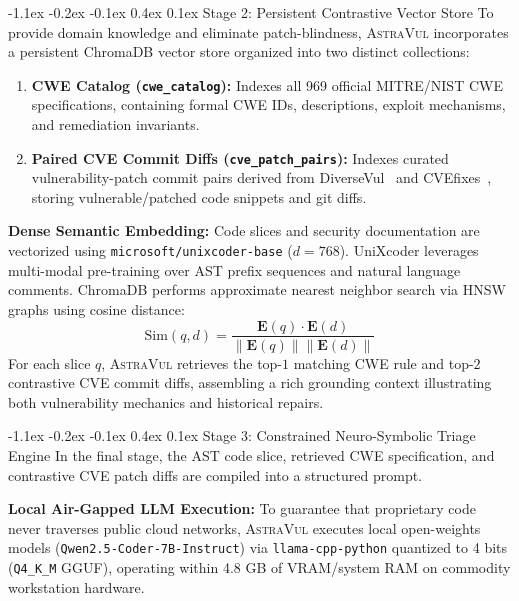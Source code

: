 \documentclass[10pt,twocolumn]{article}
\makeatletter
\renewcommand\subsection{\@startsection{subsection}{2}{\z@}%
  {-1.1ex \@plus -0.2ex \@minus -0.1ex}%
  {0.4ex \@plus 0.1ex}%
  {\normalfont\normalsize\bfseries}}
\makeatother
\begin{document}
\subsection{Stage 2: Persistent Contrastive Vector Store}
To provide domain knowledge and eliminate patch-blindness, \textsc{AstraVul} incorporates a persistent ChromaDB vector store organized into two distinct collections:
\begin{enumerate}[leftmargin=9pt,topsep=1pt,itemsep=0.5pt]
    \item \textbf{CWE Catalog (\texttt{cwe\_catalog}):} Indexes all 969 official MITRE/NIST CWE specifications, containing formal CWE IDs, descriptions, exploit mechanisms, and remediation invariants.
    \item \textbf{Paired CVE Commit Diffs (\texttt{cve\_patch\_pairs}):} Indexes curated vulnerability-patch commit pairs derived from DiverseVul~\cite{chen2023diversevul} and CVEfixes~\cite{bhandari2021cvefixes}, storing vulnerable/patched code snippets and git diffs.
\end{enumerate}

\vspace{1pt}\noindent\textbf{Dense Semantic Embedding:}
Code slices and security documentation are vectorized using \texttt{microsoft/unixcoder-base} ($d=768$). UniXcoder leverages multi-modal pre-training over AST prefix sequences and natural language comments. ChromaDB performs approximate nearest neighbor search via HNSW graphs using cosine distance:
\begin{equation}
    \text{Sim}(q, d) = \frac{\mathbf{E}(q) \cdot \mathbf{E}(d)}{\|\mathbf{E}(q)\| \|\mathbf{E}(d)\|}
\end{equation}
For each slice $q$, \textsc{AstraVul} retrieves the top-$1$ matching CWE rule and top-$2$ contrastive CVE commit diffs, assembling a rich grounding context illustrating both vulnerability mechanics and historical repairs.

\subsection{Stage 3: Constrained Neuro-Symbolic Triage Engine}
In the final stage, the AST code slice, retrieved CWE specification, and contrastive CVE patch diffs are compiled into a structured prompt.

\vspace{1pt}\noindent\textbf{Local Air-Gapped LLM Execution:}
To guarantee that proprietary code never traverses public cloud networks, \textsc{AstraVul} executes local open-weights models (\texttt{Qwen2.5-Coder-7B-Instruct}) via \texttt{llama-cpp-python} quantized to 4 bits (\texttt{Q4\_K\_M} GGUF), operating within 4.8 GB of VRAM/system RAM on commodity workstation hardware.
\end{document}
